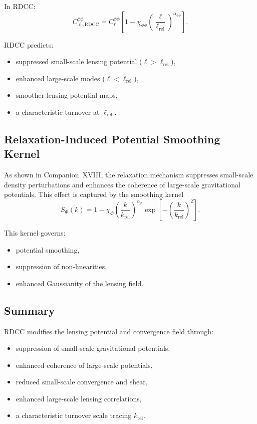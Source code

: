 \documentclass[11pt,a4paper]{article}
\begin{document}
In RDCC:
\begin{equation}
C_{\ell,\mathrm{RDCC}}^{\phi\phi}
=
C_{\ell}^{\phi\phi}
\left[
1
-
\chi_{\phi\phi}
\left(
\frac{\ell}{\ell_{\mathrm{rel}}}
\right)^{\alpha_{\phi\phi}}
\right].
\end{equation}

RDCC predicts:
\begin{itemize}
\item suppressed small-scale lensing potential ($\ell > \ell_{\mathrm{rel}}$),
\item enhanced large-scale modes ($\ell < \ell_{\mathrm{rel}}$),
\item smoother lensing potential maps,
\item a characteristic turnover at $\ell_{\mathrm{rel}}$.
\end{itemize}

\subsection{Relaxation-Induced Potential Smoothing Kernel}

As shown in Companion~XVIII, the relaxation mechanism suppresses small-scale density
perturbations and enhances the coherence of large-scale gravitational potentials. This effect is
captured by the smoothing kernel
\begin{equation}
S_{\Phi}(k)
=
1
-
\chi_{\Phi}
\left(
\frac{k}{k_{\mathrm{rel}}}
\right)^{\alpha_{\Phi}}
\exp\!\left[
-
\left(
\frac{k}{k_{\mathrm{rel}}}
\right)^{2}
\right].
\end{equation}

This kernel governs:
\begin{itemize}
\item potential smoothing,
\item suppression of non-linearities,
\item enhanced Gaussianity of the lensing field.
\end{itemize}

\subsection{Summary}

RDCC modifies the lensing potential and convergence field through:
\begin{itemize}
\item suppression of small-scale gravitational potentials,
\item enhanced coherence of large-scale potentials,
\item reduced small-scale convergence and shear,
\item enhanced large-scale lensing correlations,
\item a characteristic turnover scale tracing $k_{\mathrm{rel}}$.
\end{itemize}
\end{document}
